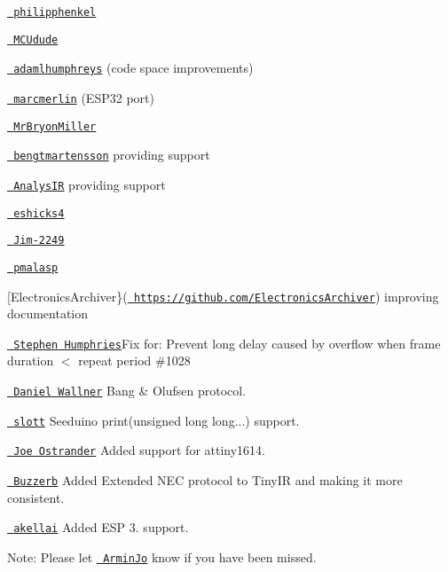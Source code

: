 \begin{DoxyItemize}
\item \href{https://github.com/philipphenkel}{\texttt{ philipphenkel}}
\item \href{https://github.com/MCUdude}{\texttt{ MCUdude}}
\item \href{https://github.com/adamlhumphreys}{\texttt{ adamlhumphreys}} (code space improvements)
\item \href{https://github.com/marcmerlin}{\texttt{ marcmerlin}} (ESP32 port)
\item \href{https://github.com/MrBryonMiller}{\texttt{ Mr\+Bryon\+Miller}}
\item \href{https://github.com/bengtmartensson}{\texttt{ bengtmartensson}} providing support
\item \href{https:/github.com/AnalysIR}{\texttt{ Analys\+IR}} providing support
\item \href{https://github.com/eshicks4}{\texttt{ eshicks4}}
\item \href{https://github.com/Jim-2249}{\texttt{ Jim-\/2249}}
\item \href{https://github.com/pmalasp}{\texttt{ pmalasp}}
\item \mbox{[}Electronics\+Archiver\}(\href{https://github.com/ElectronicsArchiver}{\texttt{ https\+://github.\+com/\+Electronics\+Archiver}}) improving documentation
\item \href{https://github.com/sjahu}{\texttt{ Stephen Humphries}}Fix for\+: Prevent long delay caused by overflow when frame duration \texorpdfstring{$<$}{<} repeat period \#1028
\item \href{https://github.com/danielwallner}{\texttt{ Daniel Wallner}} Bang \& Olufsen protocol.
\item \href{https://stackoverflow.com/users/11680056/sklott}{\texttt{ slott}} Seeduino print(unsigned long long...) support.
\item \href{https://github.com/joeostrander}{\texttt{ Joe Ostrander}} Added support for attiny1614.
\item \href{https://github.com/Buzzerb}{\texttt{ Buzzerb}} Added Extended NEC protocol to Tiny\+IR and making it more consistent.
\item \href{https://github.com/akellai}{\texttt{ akellai}} Added ESP 3. support.
\end{DoxyItemize}

Note\+: Please let \href{https://github.com/ArminJo}{\texttt{ Armin\+Jo}} know if you have been missed. 